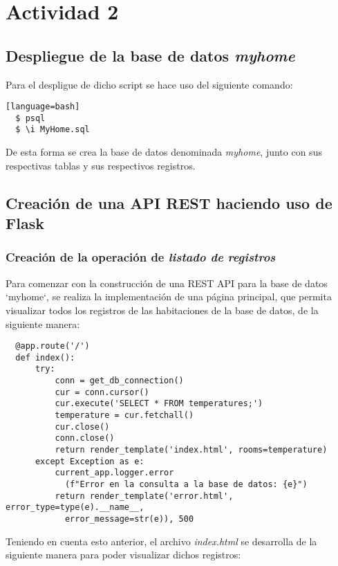 \documentclass[11pt]{report}
\begin{document}
\chapter{Actividad 2}

\section{Despliegue de la base de datos \emph{myhome}}

Para el despligue de dicho script se hace uso del siguiente comando:

\begin{verbatim}[language=bash]
  $ psql
  $ \i MyHome.sql
\end{verbatim}

De esta forma se crea la base de datos denominada \emph{myhome}, junto con sus respectivas tablas y sus respectivos registros.

\section{Creación de una API REST haciendo uso de Flask}

\subsection{Creación de la operación de \emph{listado de registros}}

Para comenzar con la construcción de una REST API para la base de datos `myhome`,  se realiza la implementación de una página principal, que permita visualizar todos los registros de las habitaciones de la base de datos, de la siguiente manera:

\begin{verbatim}
  @app.route('/')
  def index():
      try:
          conn = get_db_connection()
          cur = conn.cursor()
          cur.execute('SELECT * FROM temperatures;')
          temperature = cur.fetchall()
          cur.close()
          conn.close()
          return render_template('index.html', rooms=temperature)
      except Exception as e:
          current_app.logger.error
            (f"Error en la consulta a la base de datos: {e}")
          return render_template('error.html', error_type=type(e).__name__, 
            error_message=str(e)), 500
\end{verbatim}

Teniendo en cuenta esto anterior, el archivo \emph{index.html} se desarrolla de la siguiente manera para poder visualizar dichos registros:
\end{document}
